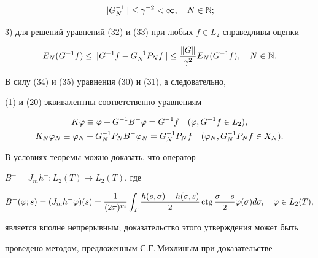 \begin{equation}


\|G_N^{-1}\|\lea \gamma^{-2}<\infty,\quad N\in \N;


\end{equation}





3) для решений уравнений (32) и (33) при любых $f\in L_2$ справедливы оценки


\begin{equation}


E_N(G^{-1}f) \lea \|G^{-1}f - G_N^{-1}P_Nf\|\lea


\frac{\|G\|}{\gamma^2}E_N(G^{-1}f),\quad N\in\N.


\end{equation}





В силу (34) и (35) уравнения (30) и (31), а следовательно, 


(1) и (20) эквивалентны соответственно уравнениям 


\begin{gather}


K\vp \equiv \vp+G^{-1}B^{-}\vp = G^{-1}f \quad (\vp, G^{-1}f \in L_2),\\


%


K_N\vp_N\equiv \vp_N + G^{-1}_NP_N B^{-}\vp_N = G_N^{-1}P_Nf \quad


(\vp_N, G_N^{-1}P_Nf\in X_N).


\end{gather}


В условиях теоремы можно доказать, что оператор 


$B^{-} = J_m h^{-}:L_2(T)\to L_2(T)$, где


\begin{equation}


B^{-}(\vp;s) = (J_m h^{-}\vp)(s)=\frac{1}{(2\pi)^m}


\int_{T}\frac{h(s,\sigma)-h(\sigma,s)}{2}\ctg


\frac{\sigma-s}{2}\vp(\sigma)d\sigma,\quad


\vp\in L_2(T),


\end{equation}


является вполне непрерывным; доказательство этого утверждения может быть 


проведено методом, предложенным С.Г.\,Михлиным при доказательстве 


